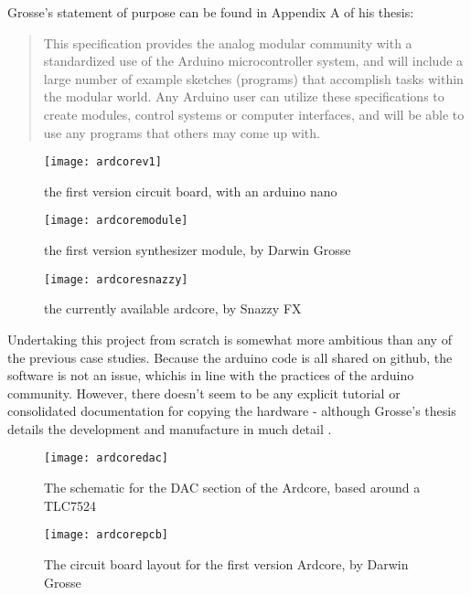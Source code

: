 Grosse's statement of purpose can be found in Appendix A of his thesis: 

\begin{quote}

	This specification provides the analog modular community with a standardized use of the Arduino microcontroller system, and will include a large number of example sketches (programs) that accomplish tasks within the modular world. Any Arduino user can utilize these specifications to create modules, control systems or computer interfaces, and will be able to use any programs that others may come up with.
	
	\end{quote}
	
	\citep{grosse2011}
		
		\begin{figure}[h!]
		  \caption{the first version circuit board, with an arduino nano}
		  \centering
		    \texttt{[image: ardcorev1]}
		\end{figure}
		
		\begin{figure}[h!]
		  \caption{the first version synthesizer module, by Darwin Grosse}
		  \centering
		    \texttt{[image: ardcoremodule]}
		\end{figure}
		
		\begin{figure}[h!]
		  \caption{the currently available ardcore, by Snazzy FX}
		  \centering
		    \texttt{[image: ardcoresnazzy]}
		\end{figure}

Undertaking this project from scratch is somewhat more ambitious than any of the previous case studies. Because the arduino code is all shared on github, the software is not an issue, whichis in line with the practices of the arduino community. However, there doesn't seem to be any explicit tutorial or consolidated documentation for copying the hardware - although Grosse's thesis details the development and manufacture in much detail \citep[pp.21-31]{grosse2011}. 

		\begin{figure}[h!]
		  \caption{The schematic for the DAC section of the Ardcore, based around a TLC7524}
		  \centering
		    \texttt{[image: ardcoredac]}
		\end{figure}
		
		\begin{figure}[h!]
		  \caption{The circuit board layout for the first version Ardcore, by Darwin Grosse}
		  \centering
		    \texttt{[image: ardcorepcb]}
		\end{figure}

